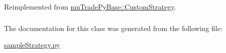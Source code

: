 Reimplemented from \hyperlink{classmuTradePyBase_1_1CustomStrategy_a6cd3aa3febbc8ad76120b43a7663301f}{muTradePyBase::CustomStrategy}.\hypertarget{classsampleStrategy_1_1sample_a16b54cb178bab35f6749e1264512c246}{
\subsubsection[{TradeInstrument}]{}}
\label{classsampleStrategy_1_1sample_a16b54cb178bab35f6749e1264512c246}


The documentation for this class was generated from the following file:\begin{DoxyCompactItemize}
\item 
\hyperlink{sampleStrategy_8py}{sampleStrategy.py}\end{DoxyCompactItemize}
